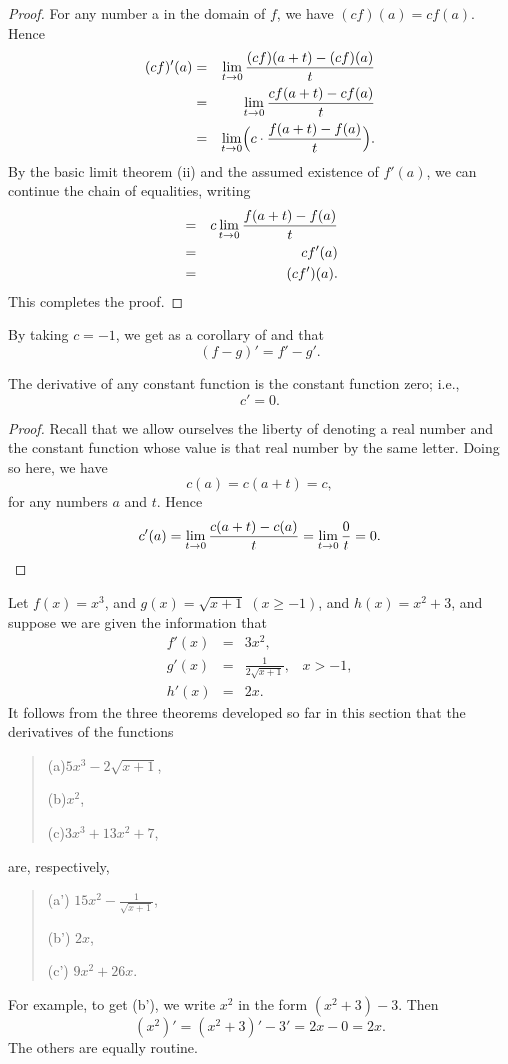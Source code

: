\begin{proof}
For any number a in the domain of $f$,
we have $(cf)(a) = cf(a)$.
Hence 
\begin{eqnarray*}
(cf)'(a)
&=&
\lim_{t \rightarrow 0} {\frac{ (cf)(a + t) - (cf)(a) }{t} }  \\
&=&
\lim_{t \rightarrow 0} {\frac{ cf(a + t) - cf(a)}{t} }   \\
&=&
\lim_{t \rightarrow 0} \Bigl(c \cdot {\frac{f(a + t) - f(a)}{t}} \Bigr).  
\end{eqnarray*}
By the basic limit theorem (ii)
and the assumed existence of $f'(a)$,
we can continue the chain of equalities,
writing
\begin{eqnarray*}
&=&
c \lim_{t \rightarrow 0} {\frac {f(a + t) - f(a)}{t} }  \\
&=&
cf'(a)\\
&=&
(cf')(a).
\end{eqnarray*}
This completes the proof.
\end{proof}

By taking $c = -1$, we get as a corollary of
 and 
that 
$$
(f - g)' = f'- g'. 
$$

\begin{prop}\label{thm 1.7.3}
The derivative of any constant function is the constant function zero; i.e., 
$$
c' = 0.
$$
\end{prop}

\begin{proof}
Recall that we allow ourselves the liberty of
denoting a real number and the constant function whose value
is that real number by the same letter.
Doing so here, we have 
\[
c(a) = c(a + t) = c, 
\]
for any numbers $a$ and $t$.
Hence 
\[
c'(a)
=
\lim_{t \rightarrow 0}
{\frac{c(a + t) - c(a)}{t} }
=
\lim_{t \rightarrow 0}{\frac{0}{t}} = 0.
\]
\end{proof}

\begin{example}
\label{exam 1.7.1}
Let $f(x) = x^3$, and $g(x) = \sqrt{x + 1} \; (x \geq -1)$,
and $h(x) = x^2 + 3$,
and suppose we are given the information that 
\begin{eqnarray*}
 f'(x) &=& 3x^2,    \\
 g'(x) &=& \frac{1}{2{\sqrt{x + 1}}},  \;\;\;  x > -1,\\
 h'(x) &=& 2x.
\end{eqnarray*}
It follows from the three theorems developed so far in this section
that the derivatives of the functions
\begin{quote}
(a)$5x^3 - 2 \sqrt{x+1}$,

(b)$x^2$,

(c)$3x^3 + 13x^2 + 7$,
\end{quote}
are, respectively, 
\begin{quote}
(a') $15x^2 - \frac{1}{\sqrt{x + 1}}$,

(b') $2x$, 

(c') $9x^2 + 26x$.
\end{quote} 
For example, to get (b'),
we write $x^2$ in the form $(x^2 + 3) - 3$.
Then
\[
(x^2)' = (x^2 + 3)' - 3' = 2x - 0 = 2x.
\]
The others are equally routine.
\end{example}

